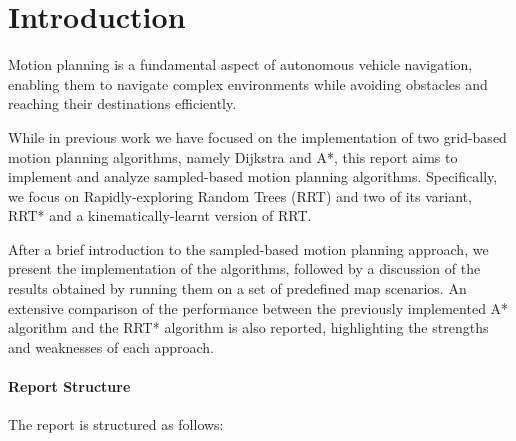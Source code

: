 \section{Introduction}
\label{sec:introduction}

Motion planning is a fundamental aspect of autonomous vehicle navigation, enabling them to navigate complex environments while avoiding obstacles and reaching their destinations efficiently.

While in previous work we have focused on the implementation of two grid-based motion planning algorithms, namely Dijkstra and A*, this report aims to implement and analyze sampled-based motion planning algorithms.
Specifically, we focus on Rapidly-exploring Random Trees (RRT) and two of its variant, RRT* and a kinematically-learnt version of RRT.

After a brief introduction to the sampled-based motion planning approach, we present the implementation of the algorithms, followed by a discussion of the results obtained by running them on a set of predefined map scenarios.
An extensive comparison of the performance between the previously implemented A* algorithm and the RRT* algorithm is also reported, highlighting the strengths and weaknesses of each approach.


\paragraph{Report Structure}

The report is structured as follows:

